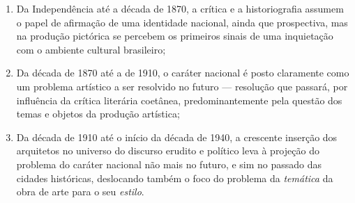 \begin{enumerate}
\def\labelenumi{(\arabic{enumi})}
\tightlist
\item
  Da Independência até a década de 1870, a crítica e a historiografia
  assumem o papel de afirmação de uma identidade nacional, ainda que
  prospectiva, mas na produção pictórica se percebem os primeiros sinais
  de uma inquietação com o ambiente cultural brasileiro;
\item
  Da década de 1870 até a de 1910, o caráter nacional é posto claramente
  como um problema artístico a ser resolvido no futuro --- resolução que
  passará, por influência da crítica literária coetânea,
  predominantemente pela questão dos temas e objetos da produção
  artística;
\item
  Da década de 1910 até o início da década de 1940, a crescente inserção
  dos arquitetos no universo do discurso erudito e político leva à
  projeção do problema do caráter nacional não mais no futuro, e sim no
  passado das cidades históricas, deslocando também o foco do problema
  da \emph{temática} da obra de arte para o seu \emph{estilo}.
\end{enumerate}
